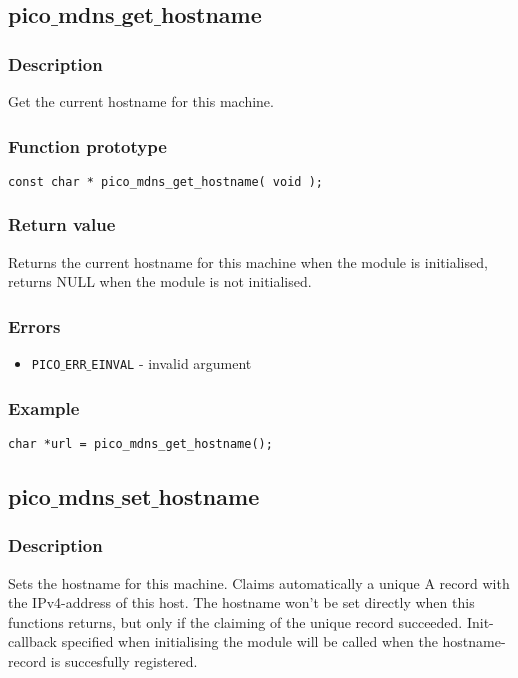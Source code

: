 \subsection{pico$\_$mdns$\_$get$\_$hostname}

\subsubsection*{Description}
Get the current hostname for this machine.

\subsubsection*{Function prototype}
\begin{verbatim}
const char * pico_mdns_get_hostname( void );
\end{verbatim}

\subsubsection*{Return value}
Returns the current hostname for this machine when the module is initialised, returns NULL when the module is not initialised.

\subsubsection*{Errors}
\begin{itemize}[noitemsep]
\item \texttt{PICO$\_$ERR$\_$EINVAL} - invalid argument
\end{itemize}

\subsubsection*{Example}
\begin{verbatim}
char *url = pico_mdns_get_hostname();
\end{verbatim}


\subsection{pico$\_$mdns$\_$set$\_$hostname}

\subsubsection*{Description}
Sets the hostname for this machine. Claims automatically a unique A record with the IPv4-address of this host. The hostname won't be set directly when this functions returns, but only if the claiming of the unique record succeeded. Init-callback specified when initialising the module will be called when the hostname-record is succesfully registered.

